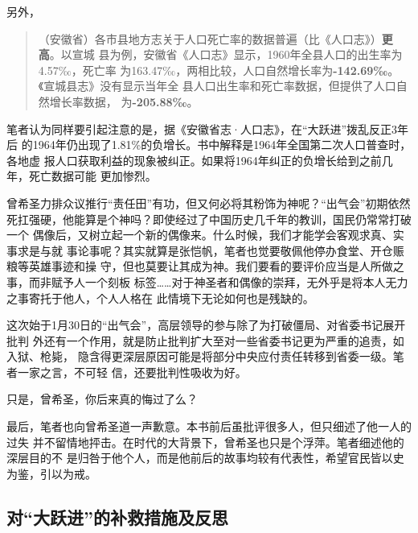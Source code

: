 另外，
\begin{quotation}
  （安徽省）各市县地方志关于人口死亡率的数据普遍（比《人口志》）\textbf{更高}。以宣城
  县为例，安徽省《人口志》显示，1960年全县人口的出生率为4.57‰，死亡率
  为163.47‰，两相比较，人口自然增长率为\textbf{-142.69‰}。《宣城县志》没有显示当年全
  县人口出生率和死亡率数据，但提供了人口自然增长率数据，
  为\textbf{-205.88‰}。\cite{zaihuangchayixing}
\end{quotation}


笔者认为同样要引起注意的是，据《安徽省志·人口志》，在“大跃进”拨乱反正3年后
的1964年仍出现了1.81\%的负增长。书中解释是1964年全国第二次人口普查时，各地虚
报人口获取利益的现象被纠正。如果将1964年纠正的负增长给到之前几年，死亡数据可能
更加惨烈。

曾希圣力排众议推行“责任田”有功，但又何必将其粉饰为神呢？“出气会”初期依然
死扛强硬，他能算是个神吗？即使经过了中国历史几千年的教训，国民仍常常打破一个
偶像后，又树立起一个新的偶像来。什么时候，我们才能学会客观求真、实事求是与就
事论事呢？其实就算是张恺帆，笔者也觉要敬佩他停办食堂、开仓赈粮等英雄事迹和操
守，但也莫要让其成为神。我们要看的要评价应当是人所做之事，而非赋予人一个刻板
标签……对于神圣者和偶像的崇拜，无外乎是将本人无力之事寄托于他人，个人人格在
此情境下无论如何也是残缺的。

这次始于1月30日的“出气会”，高层领导的参与除了为打破僵局、对省委书记展开批判
外还有一个作用，就是防止批判扩大至对一些省委书记更为严重的追责，如入狱、枪毙，
隐含得更深层原因可能是将部分中央应付责任转移到省委一级。笔者一家之言，不可轻
信，还要批判性吸收为好。

只是，曾希圣，你后来真的悔过了么？

最后，笔者也向曾希圣道一声歉意。本书前后虽批评很多人，但只细述了他一人的过失
并不留情地抨击。在时代的大背景下，曾希圣也只是个浮萍。笔者细述他的深层目的不
是归咎于他个人，而是他前后的故事均较有代表性，希望官民皆以史为鉴，引以为戒。

\subsection{对“大跃进”的补救措施及反思}

